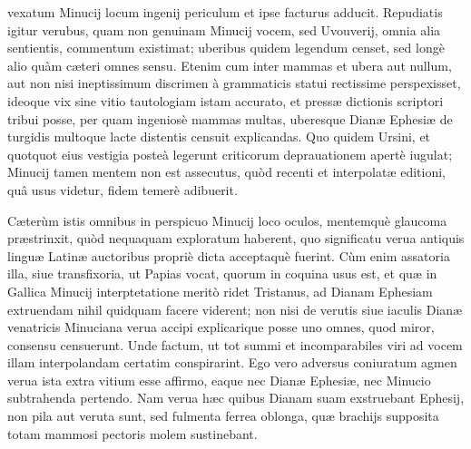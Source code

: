 \documentclass[a4paper, 11pt, oneside, polutonikogreek, latin]{article}
\begin{document}
vexatum Minucij locum ingenij periculum et ipse facturus adducit. Repudiatis igitur verubus, quam non genuinam Minucij vocem, sed Uvouverij, omnia alia sentientis, commentum existimat; uberibus quidem legendum censet, sed longè alio quàm cæteri omnes sensu. Etenim cum inter mammas et ubera aut nullum, aut non nisi ineptissimum discrimen à grammaticis statui rectissime perspexisset, ideoque vix sine vitio tautologiam istam accurato, et pressæ dictionis scriptori tribui posse, per quam ingeniosè mammas multas, uberesque Dianæ Ephesiæ de turgidis multoque lacte distentis censuit explicandas. Quo quidem Ursini, et quotquot eius vestigia posteà legerunt criticorum deprauationem apertè iugulat; Minucij tamen mentem non est assecutus, quòd recenti et interpolatæ editioni, quâ usus videtur, fidem temerè adibuerit.

Cæterùm istis omnibus in perspicuo Minucij loco oculos, mentemquè glaucoma præstrinxit, quòd nequaquam exploratum haberent, quo significatu verua antiquis linguæ Latinæ auctoribus propriè dicta acceptaquè fuerint. Cùm enim assatoria illa, siue transfixoria, ut Papias vocat, quorum in coquina usus est, et quæ in Gallica Minucij interptetatione meritò ridet Tristanus, ad Dianam Ephesiam extruendam nihil quidquam facere viderent; non nisi de verutis siue iaculis Dianæ venatricis Minuciana verua accipi explicarique posse uno omnes, quod miror, consensu censuerunt. Unde factum, ut tot summi et incomparabiles viri ad vocem illam interpolandam certatim conspirarint. Ego vero adversus coniuratum agmen verua ista extra vitium esse affirmo, eaque nec Dianæ Ephesiæ, nec Minucio subtrahenda pertendo. Nam verua hæc quibus Dianam suam exstruebant Ephesij, non pila aut veruta sunt, sed fulmenta ferrea oblonga, quæ brachijs supposita totam mammosi pectoris molem sustinebant.
\end{document}
